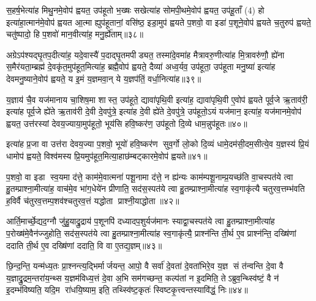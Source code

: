 स॒हर्\mbox{}ष॒भेत्या॑ह मिथु॒नमे॒वोप॑ ह्वयत॒ उप॑हूतो भ॒ख्षः सखेत्या॑ह सोमपी॒थमे॒वोप॑ ह्वयत॒ उप॑हू॒ताँ (4) हो इत्या॑हा॒त्मान॑मे॒वोप॑ ह्वयत आ॒त्मा ह्युप॑हूतानां॒ वसि॑ष्ठ॒ इडा॒मुप॑ ह्वयते प॒शवो॒ वा इडा॑ प॒शूने॒वोप॑ ह्वयते च॒तुरुप॑ ह्वयते॒ चतु॑ष्पादो॒ हि प॒शवो॑ मान॒वीत्या॑ह॒ मनु॒र्\mbox{}ह्ये॑ताम्॥३८॥

अग्रेऽप॑श्यद्घृ॒तप॒दीत्या॑ह॒ यदे॒वास्यै॑ प॒दाद्घृ॒तमपीड्यत॒ तस्मा॑दे॒वमा॑ह मैत्रावरु॒णीत्या॑ह मि॒त्रावरु॑णौ॒ ह्ये॑ना स॒मैर॑यता॒म्ब्रह्म॑ दे॒वकृ॑त॒मुप॑हूत॒मित्या॑ह॒ ब्रह्मै॒वोप॑ ह्वयते॒ दैव्या॑ अध्व॒र्यव॒ उप॑हूता॒ उप॑हूता मनु॒ष्या॑ इत्या॑ह देवमनु॒ष्याने॒वोप॑ ह्वयते॒ य इ॒मं य॒ज्ञमवा॒न् ये य॒ज्ञप॑तिं॒ वर्धा॒नित्या॑ह॥३९॥

य॒ज्ञाय॑ चै॒व यज॑मानाय चा॒शिष॒मा शास्त॒ उप॑हूते॒ द्यावा॑पृथि॒वी इत्या॑ह॒ द्यावा॑पृथि॒वी ए॒वोप॑ ह्वयते पूर्व॒जे ऋ॒ताव॑री॒ इत्या॑ह पूर्व॒जे ह्ये॑ते ऋ॒ताव॑री दे॒वी दे॒वपु॑त्रे॒ इत्या॑ह दे॒वी ह्ये॑ते दे॒वपु॑त्रे॒ उप॑हूतो॒ऽयं यज॑मान॒ इत्या॑ह॒ यज॑मानमे॒वोप॑ ह्वयत॒ उत्त॑रस्यां देवय॒ज्याया॒मुप॑हूतो॒ भूय॑सि हवि॒ष्कर॑ण॒ उप॑हूतो दि॒व्ये धाम॒न्नुप॑हूतः॥४०॥

इत्या॑ह प्र॒जा वा उत्त॑रा देवय॒ज्या प॒शवो॒ भूयो॑ हवि॒ष्कर॑ण सुव॒र्गो लो॒को दि॒व्यं धामे॒दम॑सी॒दम॒सीत्ये॒व य॒ज्ञस्य॑ प्रि॒यं धामोप॑ ह्वयते॒ विश्व॑मस्य प्रि॒यमुप॑हूत॒मित्या॒हाछ॑म्बट्कारमे॒वोप॑ ह्वयते॥४१॥

{\anuvakamend[{आ॒ह॒ धे॒नुरे॒तां वर्धा॒नित्या॑ह॒ धाम॒न्नुप॑हूत॒श्चतु॑स्त्रिशच्च॥७॥}]}

प॒शवो॒ वा इडा स्व॒यमा द॑त्ते॒ काम॑मे॒वात्मना॑ पशू॒नामा द॑त्ते॒ न ह्य॑न्यः काम॑म्पशू॒नाम्प्र॒यच्छ॑ति वा॒चस्पत॑ये त्वा हु॒तम्प्राश्ना॒मीत्या॑ह॒ वाच॑मे॒व भा॑ग॒धेये॑न प्रीणाति॒ सद॑स॒स्पत॑ये त्वा हु॒तम्प्राश्ना॒मीत्या॑ह स्व॒गाकृ॑त्यै चतुरव॒त्तम्भ॑वति ह॒विर्वै च॑तुरव॒त्तम्प॒शव॑श्चतुरव॒त्तं यद्धोता प्राश्नी॒याद्धोता॥४२॥

आर्ति॒मार्च्छे॒द्यद॒ग्नौ जु॑हु॒याद्रु॒द्राय॑ प॒शूनपि॑ दध्यादप॒शुर्यज॑मानः स्याद्वा॒चस्पत॑ये त्वा हु॒तम्प्राश्ना॒मीत्या॑ह प॒रोख्ष॑मे॒वैन॑ज्जुहोति॒ सद॑स॒स्पत॑ये त्वा हु॒तम्प्राश्ना॒मीत्या॑ह स्व॒गाकृ॑त्यै॒ प्राश्न॑न्ति ती॒र्थ ए॒व प्राश्न॑न्ति॒ दख्षि॑णां ददाति ती॒र्थ ए॒व दख्षि॑णां ददाति॒ वि वा ए॒तद्य॒ज्ञम्॥४३॥

छि॒न्द॒न्ति॒ यन्म॑ध्य॒तः प्रा॒श्नन्त्य॒द्भिर्मार्जयन्त॒ आपो॒ वै सर्वा॑ दे॒वता॑ दे॒वता॑भिरे॒व य॒ज्ञ सं त॑न्वन्ति दे॒वा वै य॒ज्ञाद्रु॒द्रम॒न्तरा॑य॒न्थ्स य॒ज्ञम॑विध्य॒त्तं दे॒वा अ॒भि सम॑गच्छन्त॒ कल्प॑तां न इ॒दमिति॒ तेऽब्रुव॒न्थ्स्वि॑ष्टं॒ वै न॑ इ॒दम्भ॑विष्यति॒ यदि॒म रा॑धयि॒ष्याम॒ इति॒ तथ्स्वि॑ष्ट॒कृतः॑ स्विष्टकृ॒त्त्वन्तस्यावि॑द्धं॒ निः॥४४॥

